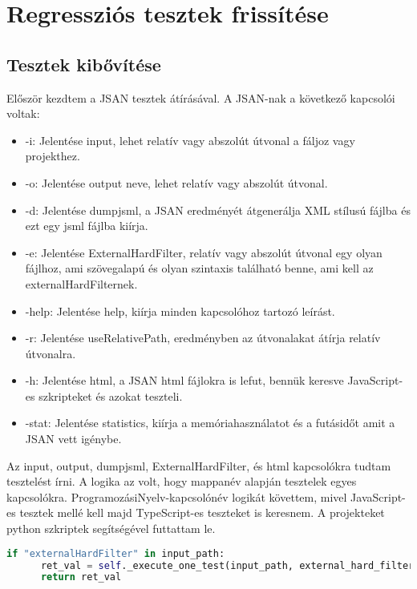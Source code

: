 \chapter{Regressziós tesztek frissítése}\label{chap:Regteszt_frissítés}

\section{Tesztek kibővítése}

\noindent

Először kezdtem a JSAN tesztek átírásával. A JSAN-nak a következő kapcsolói voltak:
\begin{itemize}
      \item -i: Jelentése input, lehet relatív vagy abszolút útvonal a fáljoz vagy projekthez.
      \item -o: Jelentése output neve, lehet relatív vagy abszolút útvonal.
      \item -d: Jelentése dumpjsml, a JSAN eredményét átgenerálja XML stílusú fájlba és ezt egy jsml fájlba kiírja.
      \item -e: Jelentése ExternalHardFilter, relatív vagy abszolút útvonal egy olyan fájlhoz, ami szövegalapú és olyan szintaxis található benne, ami kell az externalHardFilternek.
      \item -help: Jelentése help, kiírja minden kapcsolóhoz tartozó leírást.
      \item -r: Jelentése useRelativePath, eredményben az útvonalakat átírja relatív útvonalra.
      \item -h: Jelentése html, a JSAN html fájlokra is lefut, bennük keresve JavaScript-es szkripteket és azokat teszteli.
      \item -stat: Jelentése statistics, kiírja a memóriahasználatot és a futásidőt amit a JSAN vett igénybe.
\end{itemize}

\noindent

Az input, output, dumpjsml, ExternalHardFilter, és html kapcsolókra tudtam tesztelést írni. A logika az volt, hogy mappanév alapján tesztelek egyes kapcsolókra.
ProgramozásiNyelv-kapcsolónév logikát követtem, mivel JavaScript-es tesztek mellé kell majd TypeScript-es teszteket is keresnem.
A projekteket python szkriptek segítségével futtattam le.

\begin{lstlisting}[caption={JSAN kapcsoló vizsgálat pythonban}, label={lst:python_kapcsolo}, language={Python}]
if "externalHardFilter" in input_path:
      ret_val = self._execute_one_test(input_path, external_hard_filter=True) and ret_val
      return ret_val
\end{lstlisting}

